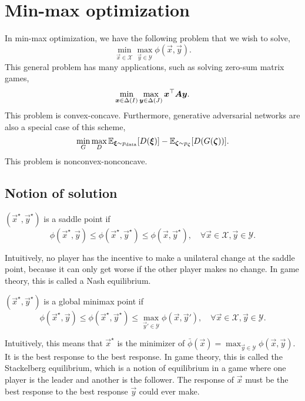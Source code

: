 \section{Min-max optimization}

In min-max optimization, we have the following problem that we wish to solve, \[
    \min_{\vec{x} \in \mathcal{X}} \max_{\vec{y} \in \mathcal{Y}} \phi(\vec{x}, \vec{y}).
\]
This general problem has many applications, such as solving zero-sum matrix games, \[
    \min_{\bm{x} \in \Delta(I)} \max_{\bm{y} \in \Delta(J)} \bm{x}^\top \bm{A} \bm{y}.
\]
This problem is convex-concave. Furthermore, generative adversarial networks are also a special
case of this scheme, \[
    \min_{G} \max_{D} \mathbb{E}_{\bm{\xi} \sim p_{\mathrm{data}}} [D(\bm{\xi})] - \mathbb{E}_{\bm{\zeta} \sim p_{\bm{\zeta}}} [D(G(\bm{\zeta}))].
\]
This problem is nonconvex-nonconcave.

\subsection{Notion of solution}

\begin{definition}
    $(\vec{x}^\star, \vec{y}^\star)$ is a saddle point if \[
        \phi(\vec{x}^\star, \vec{y}) \leq \phi(\vec{x}^\star, \vec{y}^\star) \leq \phi(\vec{x}, \vec{y}^\star), \quad \forall \vec{x} \in \mathcal{X}, \vec{y} \in \mathcal{Y}.
    \]
\end{definition}

Intuitively, no player has the incentive to make a unilateral change at the saddle point, because
it can only get worse if the other player makes no change. In game theory, this is called a Nash
equilibrium.

\begin{definition}
    $(\vec{x}^\star, \vec{y}^\star)$ is a global minimax point if \[
        \phi(\vec{x}^\star, \vec{y}) \leq \phi(\vec{x}^\star, \vec{y}^\star) \leq \max_{\vec{y}' \in \mathcal{Y}} \phi(\vec{x}, \vec{y}'), \quad \forall \vec{x} \in \mathcal{X}, \vec{y} \in \mathcal{Y}.
    \]
\end{definition}

Intuitively, this means that $\vec{x}^\star$ is the minimizer of $\bar{\phi}(\vec{x}) =
    \max_{\vec{y} \in \mathcal{Y}} \phi(\vec{x}, \vec{y})$. It is the best response to the best
response. In game theory, this is called the Stackelberg equilibrium, which is a notion of
equilibrium in a game where one player is the leader and another is the follower. The response of
$\vec{x}$ must be the best response to the best response $\vec{y}$ could ever make.

